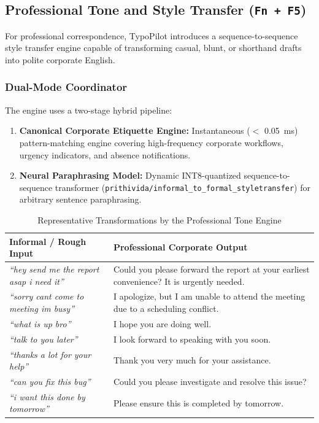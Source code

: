 \documentclass[11pt,a4paper]{article}
\begin{document}
\subsection{Professional Tone and Style Transfer (\texttt{Fn + F5})}
\label{sec:tone}
For professional correspondence, TypoPilot introduces a sequence-to-sequence style transfer engine capable of transforming casual, blunt, or shorthand drafts into polite corporate English.

\subsubsection{Dual-Mode Coordinator}
The engine uses a two-stage hybrid pipeline:
\begin{enumerate}
    \item \textbf{Canonical Corporate Etiquette Engine:} Instantaneous ($<$ 0.05~ms) pattern-matching engine covering high-frequency corporate workflows, urgency indicators, and absence notifications.
    \item \textbf{Neural Paraphrasing Model:} Dynamic INT8-quantized sequence-to-sequence transformer (\texttt{prithivida/informal\_to\_formal\_styletransfer}) for arbitrary sentence paraphrasing.
\end{enumerate}

\begin{table}[htbp]
\centering
\small
\caption{Representative Transformations by the Professional Tone Engine}
\label{tab:tone_samples}
\begin{tabularx}{\textwidth}{lX}
\toprule
\textbf{Informal / Rough Input} & \textbf{Professional Corporate Output} \\
\midrule
\textit{``hey send me the report asap i need it''} & Could you please forward the report at your earliest convenience? It is urgently needed. \\
\addlinespace
\textit{``sorry cant come to meeting im busy''} & I apologize, but I am unable to attend the meeting due to a scheduling conflict. \\
\addlinespace
\textit{``what is up bro''} & I hope you are doing well. \\
\addlinespace
\textit{``talk to you later''} & I look forward to speaking with you soon. \\
\addlinespace
\textit{``thanks a lot for your help''} & Thank you very much for your assistance. \\
\addlinespace
\textit{``can you fix this bug''} & Could you please investigate and resolve this issue? \\
\addlinespace
\textit{``i want this done by tomorrow''} & Please ensure this is completed by tomorrow. \\
\bottomrule
\end{tabularx}
\end{table}
\end{document}
